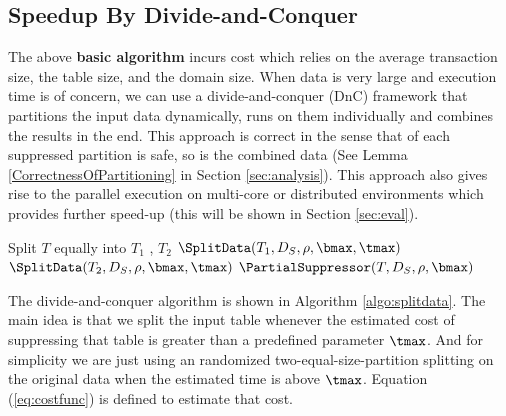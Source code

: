 \subsection{Speedup By Divide-and-Conquer}
\label{subsec:speedup}
The above \textbf{basic algorithm} incurs cost which relies on the average
transaction size, the table size, and the domain size. When data is very
large and execution time is of concern, we can use a divide-and-conquer (DnC)
framework that partitions the input data dynamically, runs \PartialSuppressor
on them individually and combines the results in the end. This approach is
correct in the sense that of each suppressed partition is safe, so is the
combined data (See Lemma \ref{CorrectnessOfPartitioning} in Section
\ref{sec:analysis}). This approach also gives rise to the parallel execution
on multi-core or distributed environments which provides further speed-up
(this will be shown in Section \ref{sec:eval}).

\begin{algorithm}
\caption{$\SplitData(T, D_S, \rho, \bmax, \tmax)$} \label{algo:splitdata}
\begin{algorithmic}[1]
        \STATE Split $T$ equally into $T_1$ , $T_2$
        \STATE $\SplitData(T_1, D_S, \rho, \bmax, \tmax)$
        \STATE $\SplitData(T_2, D_S, \rho,  \bmax, \tmax)$
    \ELSE
        \STATE $\PartialSuppressor(T, D_S, \rho, \bmax)$
    \ENDIF
\end{algorithmic}
\end{algorithm}

The divide-and-conquer algorithm is shown in Algorithm \ref{algo:splitdata}.
The main idea is that we split the input table whenever the estimated cost of
suppressing that table is greater than a predefined parameter $\tmax$. And
for simplicity we are just using an randomized two-equal-size-partition
splitting on the original data when the estimated time is above $\tmax$.
Equation (\ref{eq:costfunc}) is defined to estimate that cost.

